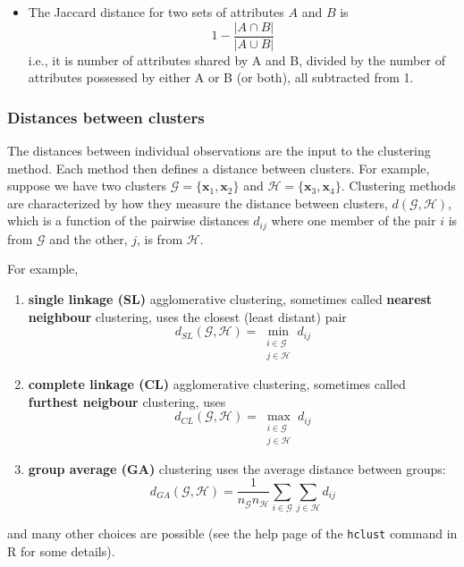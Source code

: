\documentclass[
]{book}
\providecommand{\tightlist}{%
  \setlength{\itemsep}{0pt}\setlength{\parskip}{0pt}}
\theoremstyle{definition}
\theoremstyle{definition}
\theoremstyle{definition}
\theoremstyle{definition}
\theoremstyle{remark}
\begin{document}
\begin{itemize}
\tightlist
\item
  The Jaccard distance for two sets of attributes \(A\) and \(B\) is
  \[1- \frac{|A \cap B|}{|A\cup B|}\]
  i.e., it is number of attributes shared by A and B, divided by the number of attributes possessed by either A or B (or both), all subtracted from 1.
\end{itemize}

\subsubsection{Distances between clusters}\label{distances-between-clusters}

The distances between individual observations are the input to the clustering method. Each method then defines a distance between clusters. For example, suppose we have two clusters \(\mathcal{G}=\{\mathbf x_1, \mathbf x_2\}\) and \(\mathcal{H}=\{\mathbf x_3, \mathbf x_4\}\). Clustering methods are characterized by how they measure the distance between clusters, \(d(\mathcal{G}, \mathcal{H})\), which is a function of the pairwise distances \(d_{ij}\) where one member of the pair \(i\) is from \(\mathcal{G}\) and the other, \(j\), is from \(\mathcal{H}\).

For example,

\begin{enumerate}
\def\labelenumi{\arabic{enumi}.}
\item
  \textbf{single linkage (SL)} agglomerative clustering, sometimes called \textbf{nearest neighbour} clustering, uses the closest (least distant) pair
  \[d_{SL}(\mathcal{G}, \mathcal{H}) = \min_{\substack{i\in \mathcal{G}\\ j\in \mathcal{H}}} d_{ij}\]
\item
  \textbf{complete linkage (CL)} agglomerative clustering, sometimes called \textbf{furthest neigbour} clustering, uses
  \[d_{CL}(\mathcal{G}, \mathcal{H}) = \max_{\substack{i\in \mathcal{G}\\ j\in \mathcal{H}}} d_{ij}\]
\item
  \textbf{group average (GA)} clustering uses the average distance between groups:
  \[d_{GA}(\mathcal{G}, \mathcal{H}) = \frac{1}{n_\mathcal{G}n_\mathcal{H}}\sum_{i\in\mathcal{G}}\sum_{j\in\mathcal{H}} d_{ij}\]
\end{enumerate}

and many other choices are possible (see the help page of the \texttt{hclust} command in R for some details).
\end{document}
